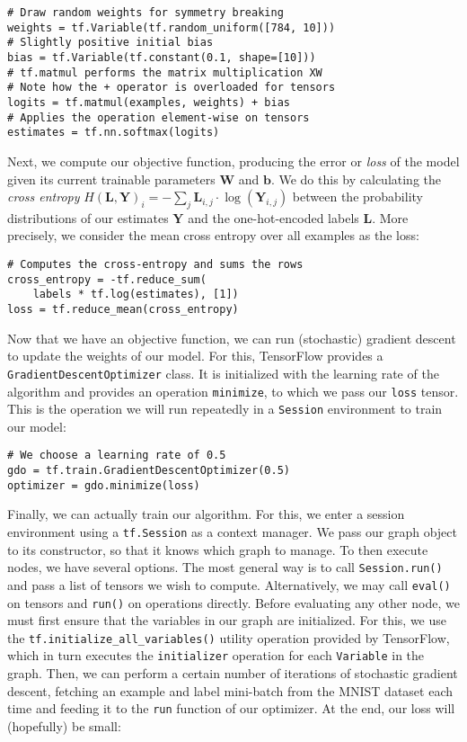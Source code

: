 \begin{lstlisting}
# Draw random weights for symmetry breaking
weights = tf.Variable(tf.random_uniform([784, 10]))
# Slightly positive initial bias
bias = tf.Variable(tf.constant(0.1, shape=[10]))
# tf.matmul performs the matrix multiplication XW
# Note how the + operator is overloaded for tensors
logits = tf.matmul(examples, weights) + bias
# Applies the operation element-wise on tensors
estimates = tf.nn.softmax(logits)
\end{lstlisting}

Next, we compute our objective function, producing the error or \emph{loss} of
the model given its current trainable parameters $\mathbf{W}$ and
$\mathbf{b}$. We do this by calculating the \emph{cross entropy}
$H(\mathbf{L}, \mathbf{Y})_i = -\sum_j \mathbf{L}_{i,j} \cdot
\log(\mathbf{Y}_{i,j})$ between the probability distributions of our estimates
$\mathbf{Y}$ and the one-hot-encoded labels $\mathbf{L}$. More precisely, we
consider the mean cross entropy over all examples as the loss:

\begin{lstlisting}
# Computes the cross-entropy and sums the rows
cross_entropy = -tf.reduce_sum(
    labels * tf.log(estimates), [1])
loss = tf.reduce_mean(cross_entropy)
\end{lstlisting}

Now that we have an objective function, we can run (stochastic) gradient descent
to update the weights of our model. For this, TensorFlow provides a
\texttt{GradientDescentOptimizer} class. It is initialized with the
learning rate of the algorithm and provides an operation \texttt{minimize}, to
which we pass our \texttt{loss} tensor. This is the operation we will run
repeatedly in a \texttt{Session} environment to train our model:

\begin{lstlisting}
# We choose a learning rate of 0.5
gdo = tf.train.GradientDescentOptimizer(0.5)
optimizer = gdo.minimize(loss)
\end{lstlisting}

Finally, we can actually train our algorithm. For this, we enter a session
environment using a \texttt{tf.Session} as a context manager. We pass our graph
object to its constructor, so that it knows which graph to manage. To then
execute nodes, we have several options. The most general way is to call
\texttt{Session.run()} and pass a list of tensors we wish to
compute. Alternatively, we may call \texttt{eval()} on tensors and
\texttt{run()} on operations directly. Before evaluating any other node, we must
first ensure that the variables in our graph are initialized. For this, we use
the \texttt{tf.initialize\_all\_variables()} utility operation provided by
TensorFlow, which in turn executes the \texttt{initializer} operation for each
\texttt{Variable} in the graph. Then, we can perform a certain number of
iterations of stochastic gradient descent, fetching an example and label
mini-batch from the MNIST dataset each time and feeding it to the \texttt{run}
function of our optimizer. At the end, our loss will (hopefully) be small:

